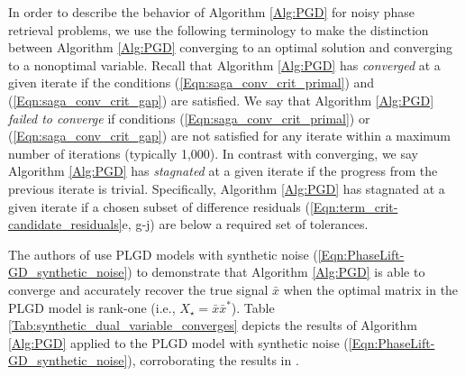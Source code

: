 In order to describe the behavior of Algorithm \ref{Alg:PGD} for noisy phase retrieval problems, we use the following terminology to make the distinction between Algorithm \ref{Alg:PGD} converging to an optimal solution and converging to a nonoptimal variable.
Recall that Algorithm \ref{Alg:PGD} has \textit{converged} at a given iterate if the conditions (\ref{Eqn:saga_conv_crit_primal}) and (\ref{Eqn:saga_conv_crit_gap}) are satisfied.  
We say that Algorithm \ref{Alg:PGD} \textit{failed to converge} if conditions (\ref{Eqn:saga_conv_crit_primal}) or (\ref{Eqn:saga_conv_crit_gap}) are not satisfied for any iterate within a maximum number of iterations (typically 1,000).
In contrast with converging, we say Algorithm \ref{Alg:PGD} has \textit{stagnated} at a given iterate if the progress from the previous iterate is trivial.
Specifically, Algorithm \ref{Alg:PGD} has stagnated at a given iterate if a chosen subset of difference residuals (\ref{Eqn:term_crit-candidate_residuals}e, g-j) are below a required set of tolerances.











The authors of \cite{DBLP:journals/siamsc/FriedlanderM16} use PLGD models with synthetic noise (\ref{Eqn:PhaseLift-GD_synthetic_noise}) to demonstrate that Algorithm \ref{Alg:PGD} is able to converge and accurately recover the true signal $\bar{x}$ when the optimal matrix in the PLGD model is rank-one (i.e., $X_\star = \bar{x} \bar{x}^*$).  
Table \ref{Tab:synthetic_dual_variable_converges} depicts the results of Algorithm \ref{Alg:PGD} applied to the PLGD model with synthetic noise (\ref{Eqn:PhaseLift-GD_synthetic_noise}), corroborating the results in \cite[Section 5.1.2]{DBLP:journals/siamsc/FriedlanderM16}.

